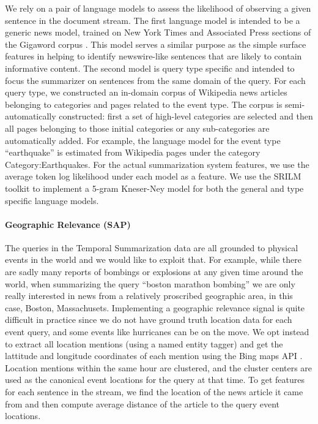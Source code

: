 We rely on a pair of language models to assess the likelihood of observing
a given sentence in the document stream. The first language model is 
intended to be a generic news model, trained on New York Times and 
Associated Press sections of the Gigaword corpus \citep{graff2003english}. 
This model serves a similar purpose as the simple surface features in helping
to identify newswire-like sentences that are likely to contain informative
content.
The second model is query type specific and intended to focus the summarizer
on sentences from the same domain of the query. For each query type, we 
constructed an in-domain corpus of Wikipedia news articles belonging to
categories and pages related to the event type. The corpus is 
semi-automatically constructed: first a set of high-level categories are 
selected and then all pages belonging to those initial categories or
any sub-categories are automatically added. 
For example, the language
model for the event type ``earthquake'' is estimated
from Wikipedia pages under the category Category:Earthquakes.
For the actual summarization system features, we use the average token log
likelihood under each model as a feature.
We use the SRILM toolkit \citep{stolke2002srilm} to implement a 5-gram 
Kneser-Ney model \citep{kneser1995improved} for both the general and type
specific language models. 

\paragraph{Geographic Relevance (SAP)} 
The queries in the Temporal Summarization data are all grounded to physical
events in the world and we would like to exploit that. For example, while
there are sadly many reports of bombings or explosions at any given time 
around the world, when summarizing the query ``boston marathon bombing'' 
we are only really interested in news from a relatively proscribed 
geographic area, in this case, Boston, Massachusets. Implementing 
a geographic relevance signal is quite difficult in practice since 
we do not have ground truth location data for each event query, and some
events like hurricanes can be on the move. We opt instead to extract all
location mentions (using a named entity tagger) and get the lattitude
and longitude coordinates
of each mention using the Bing maps API \citep{bingmaps}. Location
mentions within the same hour are clustered, and the cluster centers are 
used as the canonical event locations for the query at that time. 
To get features for each sentence in the stream, we find the location of
the news article it came from and then compute average distance of the 
article to the query event locations.


